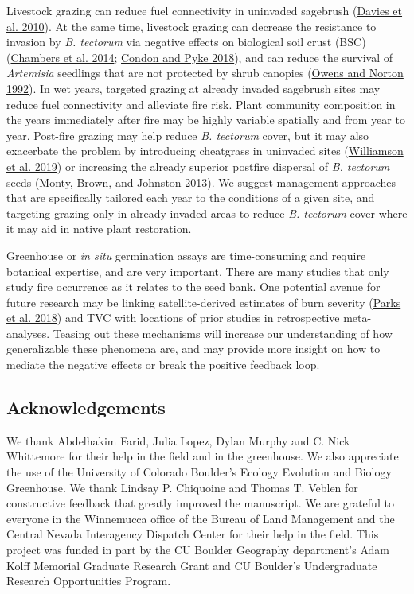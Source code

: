\documentclass[
  12pt,
]{article}
\begin{document}
Livestock grazing can reduce fuel connectivity in uninvaded sagebrush
(\protect\hyperlink{ref-Davies2010}{Davies et al. 2010}). At the same
time, livestock grazing can decrease the resistance to invasion by
\emph{B. tectorum} via negative effects on biological soil crust (BSC)
(\protect\hyperlink{ref-chambers_resilience_2014}{Chambers et al. 2014};
\protect\hyperlink{ref-Condon2018}{Condon and Pyke 2018}), and can
reduce the survival of \emph{Artemisia} seedlings that are not protected
by shrub canopies (\protect\hyperlink{ref-Owens1992}{Owens and Norton
1992}). In wet years, targeted grazing at already invaded sagebrush
sites may reduce fuel connectivity and alleviate fire risk. Plant
community composition in the years immediately after fire may be highly
variable spatially and from year to year. Post-fire grazing may help
reduce \emph{B. tectorum} cover, but it may also exacerbate the problem
by introducing cheatgrass in uninvaded sites
(\protect\hyperlink{ref-Williamson2019}{Williamson et al. 2019}) or
increasing the already superior postfire dispersal of \emph{B. tectorum}
seeds (\protect\hyperlink{ref-Monty2013}{Monty, Brown, and Johnston
2013}). We suggest management approaches that are specifically tailored
each year to the conditions of a given site, and targeting grazing only
in already invaded areas to reduce \emph{B. tectorum} cover where it may
aid in native plant restoration.

Greenhouse or \emph{in situ} germination assays are time-consuming and
require botanical expertise, and are very important. There are many
studies that only study fire occurrence as it relates to the seed bank.
One potential avenue for future research may be linking
satellite-derived estimates of burn severity
(\protect\hyperlink{ref-Parks2018}{Parks et al. 2018}) and TVC with
locations of prior studies in retrospective meta-analyses. Teasing out
these mechanisms will increase our understanding of how generalizable
these phenomena are, and may provide more insight on how to mediate the
negative effects or break the positive feedback loop.

\hypertarget{acknowledgements}{%
\subsection{Acknowledgements}\label{acknowledgements}}

We thank Abdelhakim Farid, Julia Lopez, Dylan Murphy and C. Nick
Whittemore for their help in the field and in the greenhouse. We also
appreciate the use of the University of Colorado Boulder's Ecology
Evolution and Biology Greenhouse. We thank Lindsay P. Chiquoine and
Thomas T. Veblen for constructive feedback that greatly improved the
manuscript. We are grateful to everyone in the Winnemucca office of the
Bureau of Land Management and the Central Nevada Interagency Dispatch
Center for their help in the field. This project was funded in part by
the CU Boulder Geography department's Adam Kolff Memorial Graduate
Research Grant and CU Boulder's Undergraduate Research Opportunities
Program.
\end{document}
